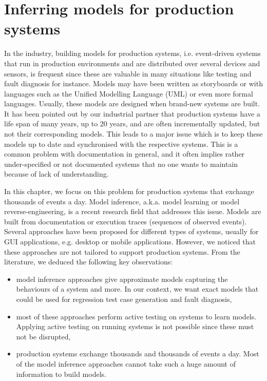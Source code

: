 \chapter{Inferring models for production systems}
\label{sec:modelinf:prodsystems}

In the industry, building models for production systems, i.e.
event-driven systems that run in production environments and are
distributed over several devices and sensors, is frequent since
these are valuable in many situations like testing and fault
diagnosis for instance. Models may have been written as
storyboards or with languages such as the Unified Modelling
Language (UML) or even more formal languages. Usually, these
models are designed when brand-new systems are built. It has been
pointed out by our industrial partner that production systems
have a life span of many years, up to 20 years, and are often
incrementally updated, but not their corresponding models. This
leads to a major issue which is to keep these models up to date
and synchronised with the respective systems. This is a common
problem with documentation in general, and it often implies
rather under-specified or not documented systems that no one
wants to maintain because of lack of understanding.

In this chapter, we focus on this problem for production systems
that exchange thousands of events a day. Model inference, a.k.a.
model learning or model reverse-engineering, is a recent research
field that addresses this issue.  Models are built from
documentation or execution traces (sequences of observed events).
Several approaches have been proposed for different types of
systems, usually for GUI applications, e.g. desktop or mobile
applications. However, we noticed that these approaches are not
tailored to support production systems.  From the literature, we
deduced the following key observations:

\begin{itemize}
    \item model inference approaches give approximate models
    capturing the behaviours of a system and more. In our
    context, we want exact models that could be used for
    regression test case generation and fault diagnosis,

    \item most of these approaches perform active testing on
    systems to learn models. Applying active testing on running
    systems is not possible since these must not be disrupted,

    \item production systems exchange thousands and thousands of
    events a day. Most of the model inference approaches cannot
    take such a huge amount of information to build models.
\end{itemize}

